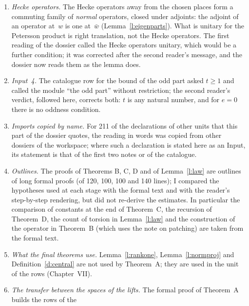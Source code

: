 \documentclass[11pt,a4paper]{article}
\newcommand{\m}[1]{\mbox{$#1$}}        %
\theoremstyle{plainx}
\theoremstyle{uprightx}
\newcommand{\cj}[1]{\bar{#1}}
\begin{document}
\begin{enumerate}[label=\textup{\arabic*.},leftmargin=1.6em,itemsep=5pt]
quantifies the lift index first, then the function~$\gamma$, then the pair \m{(\ell,\iota)}, then the pair of rank
one; (F3) quantifies the lift index, the pair and the sign before the hypothesis ``ramified''. The reading of
these clauses, of the height and of the Euler factors of the ratio follows the second reader's message on the
fit family; I compared it with the formal definition and found no difference.
\item \emph{Hecke operators.} The Hecke operators away from the chosen places form a commuting family of
\emph{normal} operators, closed under adjoints: the adjoint of an operator at~$w$ is one at~\m{\cj{w}}
(Lemma~\ref{l:eigenparts}). What is unitary for the Petersson product is right translation, not the Hecke
operators. The first reading of the dossier called the Hecke operators unitary, which would be a further
condition; it was corrected after the second reader's message, and the dossier now reads them as the lemma does.
\item \emph{Input~4.} The catalogue row for the bound of the odd part asked \m{t\ge1} and called the module
``the odd part'' without restriction; the second reader's verdict, followed here, corrects both: $t$ is any
natural number, and for \m{e=0} there is no oddness condition.
\item \emph{Imports copied by name.} For 211 of the declarations of other units that this part of the dossier
quotes, the reading in words was copied from other dossiers of the workspace; where such a declaration is
stated here as an Input, its statement is that of the first two notes or of the catalogue.
\item \emph{Outlines.} The proofs of Theorems B, C, D and of Lemma~\ref{l:law} are outlines of long formal proofs
(of 120, 100, 100 and 140 lines);
I compared the hypotheses used at each stage with the formal text and with the reader's step-by-step rendering,
but did not re-derive the estimates. In particular the comparison of constants at the end of Theorem~C, the
recursion of Theorem~D, the count of torsion in Lemma~\ref{l:law} and the construction of the operator in
Theorem~B (which uses the note on patching) are taken from the formal text.
\item \emph{What the final theorems use.} Lemma~\ref{l:rankone}, Lemma~\ref{l:normproj} and
Definition~\ref{d:central} are not used by Theorem~A; they are used in the unit of the rows (Chapter~VII).
\item \emph{The transfer between the spaces of the lifts.} The formal proof of Theorem~A builds the rows of the

\end{enumerate}
\end{document}
